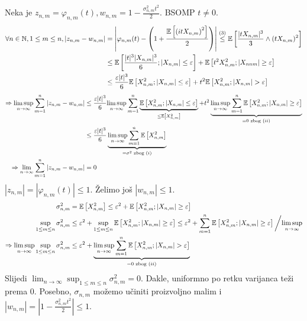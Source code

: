 \documentclass{article}
\begin{document}
Neka je \(z_{n,m}=\varphi_{n,m}(t),w_{n,m}=1-\frac{\sigma_{n,m}^2t^2}2.\) BSOMP \(t\ne0.\) \[\begin{aligned}\forall n\in\Bbb N,1\le m\le n,|z_{n,m}-w_{n,m}|&=\left|\varphi_{n,m}(t)-\left(1+\frac{\Bbb E\left[\left(itX_{n,m}\right)^2\right]}2\right)\right|\overset{(3)}{\le}\Bbb E\left[\frac{|tX_{n,m}|^3}3\land(tX_{n,m})^2\right]\\&\le\Bbb E\left[\frac{|t|^3|X_{n,m}|^3}6;|X_{n,m}|\le\varepsilon\right]+\Bbb E\left[t^2X_{n,m}^2;|X_{nnm}|\ge\varepsilon\right]\\&\le\frac{\varepsilon|t|^3}6\Bbb E\left[X_{n,m}^2;|X_{n,m}|\le\varepsilon\right]+t^2\Bbb E\left[X_{n,m}^2;|X_{n,m}|>\varepsilon\right]\end{aligned}\] \[\begin{aligned}\Rightarrow\underset{n\to\infty}{\lim\sup}\sum_{m=1}^n|z_{n,m}-w_{n,m}|&\le\frac{\varepsilon|t|^3}6\underset{n\to\infty}{\lim\sup}\sum_{m=1}^n\underbrace{\Bbb E\left[X_{n,m}^2;|X_{n,m}|\le\varepsilon\right]}_{\le\Bbb E\left[X_{n,m}^2\right]}+t^2\underbrace{\underset{n\to\infty}{\lim\sup}\sum_{m=1}^n\Bbb E\left[X_{n,m}^2;|X_{n,m}|\ge\varepsilon\right]}_{=0\text{ zbog }(ii)}\\&\le\frac{\varepsilon|t|^3}6\underbrace{\underset{n\to\infty}{\lim\sup}\sum_{m=1}^n\Bbb E\left[X_{n,m}^2\right]}_{=\sigma^2\text{ zbog }(i)}\\\Rightarrow\lim_{n\to\infty}\sum_{m=1}^n|z_{n,m}-w_{n,m}|&=0\end{aligned}\] \(|z_{n,m}|=|\varphi_{n,m}(t)|\le1.\) Želimo još \(|w_{n,m}|\le 1.\) \[\begin{aligned}\sigma_{n,m}^2&=\Bbb E\left[X_{n,m}^2\right]\le\varepsilon^2+\Bbb E\left[X_{n,m}^2;|X_{n,m}|\ge\varepsilon\right]\\\sup_{1\le m\le n}\sigma_{n,m}^2&\le\varepsilon^2+\sup_{1\le m\le n}\Bbb E\left[X_{n,m}^2;|X_{n,m}|\ge\varepsilon\right]\le\varepsilon^2+\sum_{m=1}^n\Bbb E\left[X_{n,m}^2;|X_{n,m}|\ge\varepsilon\right]\bigg/\underset{n\to\infty}{\lim\sup}\\\Rightarrow\underset{n\to\infty}{\lim\sup}\sup_{1\le m\le n}\sigma_{n,m}^2&\le\varepsilon^2+\underbrace{\underset{n\to\infty}{\lim\sup}\sum_{m=1}^n\Bbb E\left[X_{n,m}^2;|X_{n,m}|>\varepsilon\right]}_{=0\text{ zbog }(ii)}\end{aligned}\] Slijedi \(\displaystyle\lim_{n\to\infty}\sup_{1\le m\le n}\sigma_{n,m}^2=0.\) Dakle, uniformno po retku varijanca teži prema \(0.\) Posebno, \(\sigma_{n,m}\) možemo učiniti proizvoljno malim i \(|w_{n,m}|=\left|1-\frac{\sigma_{n,m}^2t^2}2\right|\le 1.\)\newline\newline
\end{document}
